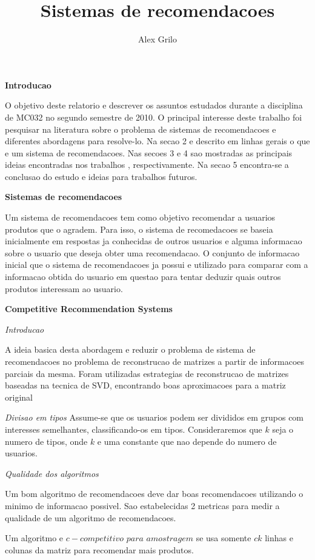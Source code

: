 \documentclass[a4paper,10pt]{article}
\title{Sistemas de recomendacoes}
\author{Alex Grilo}
\begin{document}
\maketitle


\textbf{Introducao}

O objetivo deste relatorio e descrever os assuntos estudados durante a 
disciplina de MC032 no segundo semestre de 2010. O principal interesse
deste trabalho foi pesquisar na literatura sobre
o problema de sistemas de recomendacoes e diferentes abordagens para resolve-lo. 
Na secao 2 e descrito em linhas gerais o que e um sistema de recomendacoes. 
Nas secoes 3 e 4 sao mostradas as
principais ideias encontradas nos trabalhos  ,
respectivamente. 
Na secao 5 encontra-se a conclusao do estudo e ideias para trabalhos futuros.

\textbf{Sistemas de recomendacoes}

Um sistema de recomendacoes tem como objetivo recomendar a usuarios
produtos que o agradem. Para isso, o sistema de recomedacoes se baseia
inicialmente em respostas ja conhecidas de outros usuarios e alguma
informacao sobre o usuario que deseja obter uma recomendacao. 
O conjunto de informacao inicial que o sistema de recomendacoes ja
possui e utilizado para comparar com a informacao obtida do usuario
em questao para tentar deduzir quais outros produtos interessam
ao usuario. 

\textbf{Competitive Recommendation Systems}

\textit{Introducao}

A ideia basica desta abordagem e reduzir o problema de sistema de recomendacoes
no problema de reconstrucao de matrizes a partir de informacoes parciais da mesma. 
Foram utilizadas estrategias de reconstrucao de matrizes
baseadas na tecnica de SVD, encontrando boas aproximacoes
para a matriz original 

\textit{Divisao em tipos}
Assume-se que os usuarios podem ser divididos em grupos com interesses semelhantes,
classificando-os em tipos. 
Consideraremos que $k$ seja o numero de tipos, onde $k$ e
uma constante que nao depende do numero de usuarios.

\textit{Qualidade dos algoritmos}

Um bom algoritmo de recomendacoes deve dar boas recomendacoes utilizando o minimo de 
informacao possivel. Sao estabelecidas 2 metricas para medir a qualidade de um algoritmo
de recomendacoes.

 Um algoritmo e $c-competitivo$ $para$ $amostragem$ se usa somente $ck$
linhas e colunas da matriz para recomendar mais produtos.
\end{document}
